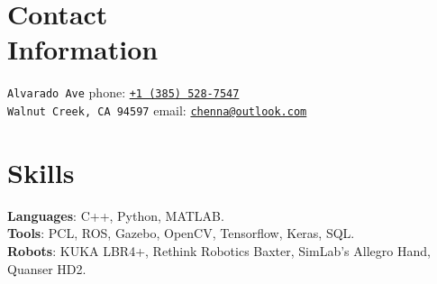 \documentclass[letterpaper, margin, line, 10.5pt]{resume}
\begin{document}
\author{Kautilya Chenna}

\begin{resume}

    
    \section{\myheadingstyle Contact \\ Information}

    \texttt{Alvarado Ave}                            \hfill phone: \texttt{\href{tel:13855287547}{+1 (385) 528-7547}}          \vspace{0mm}\\\vspace{0mm}%
    \texttt{Walnut Creek, CA 94597}                          \hfill email: \texttt{\href{mailto:chenna@outlook.com}{chenna@outlook.com}}       %


    
	\sectionseperator
	\section{\myheadingstyle Skills} 
	
	\textbf{Languages}: C++, Python, MATLAB. \\[1mm]
	\textbf{Tools}: PCL, ROS, Gazebo, OpenCV, Tensorflow, Keras, SQL. \\[1mm]
	\textbf{Robots}: KUKA LBR4+, Rethink Robotics Baxter, SimLab's Allegro Hand, Quanser HD2.%


    
    \sectionseperator

\end{resume}
\end{document}
